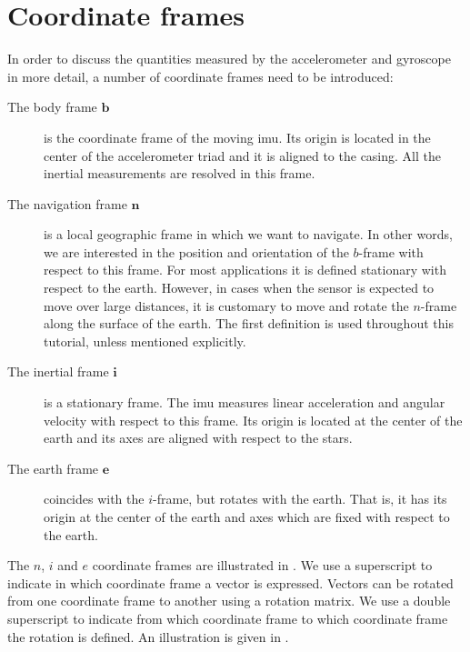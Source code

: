 \section{Coordinate frames}
\label{sec:sensors-coordFrames}
In order to discuss the quantities measured by the accelerometer and gyroscope in more detail, a number of
coordinate frames need to be introduced:
\begin{description}
\item[The body frame $\boldsymbol{b}$] is the coordinate frame of the moving
  \gls{imu}. Its origin is located in the center of the accelerometer
  triad and it is aligned to the casing. All the inertial measurements
  are resolved in this frame.
\item[The navigation frame $\boldsymbol{n}$] is a local geographic frame in which we
  want to navigate. In other words, we are interested in the position and
  orientation of the $b$-frame with respect to this frame. For most
  applications it is defined stationary with respect to the earth. However,
  in cases when the sensor is expected to move over large distances, it is customary to
  move and rotate the $n$-frame along the surface of the
  earth. The first definition is used throughout this tutorial, unless
  mentioned explicitly.
\item[The inertial frame $\boldsymbol{i}$] is a stationary frame. The
  \gls{imu} measures linear acceleration and angular velocity
  with respect to this frame. Its origin is located at the center of the
  earth and its axes are aligned with respect to the stars.
\item[The earth frame $\boldsymbol{e}$] coincides with the $i$-frame, but rotates
  with the earth. That is, it has its origin at the center of the
  earth and axes which are fixed with respect to the earth.
\end{description}
The $n$, $i$ and $e$ coordinate frames are illustrated in . We use a superscript to indicate in which coordinate frame a vector is expressed. Vectors can be rotated from one coordinate frame to another using a rotation matrix. We use a double superscript to indicate from which coordinate frame to which coordinate frame the rotation is defined. An illustration is given in . 

